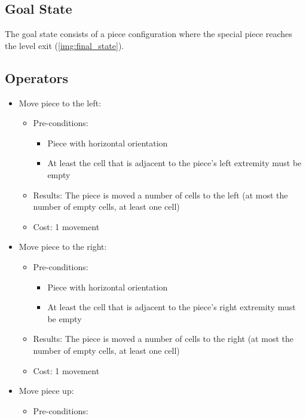 \documentclass[conference]{IEEEtran}
\begin{document}
\subsection{Goal State} \label{subsec:gs}
The goal state consists of a piece configuration where the special piece reaches the level exit (\autoref{img:final_state}).

\subsection{Operators} \label{subsec:op}
\begin{itemize}
    \item Move piece to the left:
    \begin{itemize}
        \item Pre-conditions:
        \begin{itemize}
            \item Piece with horizontal orientation
            \item At least the cell that is adjacent to the piece's left extremity must be empty
        \end{itemize}
        \item Results: The piece is moved a number of cells to the left (at most the number of empty cells, at least one cell)
        \item Cost: 1 movement
    \end{itemize}
    \item Move piece to the right:
    \begin{itemize}
        \item Pre-conditions:
        \begin{itemize}
            \item Piece with horizontal orientation
            \item At least the cell that is adjacent to the piece's right extremity must be empty
        \end{itemize}
        \item Results: The piece is moved a number of cells to the right (at most the number of empty cells, at least one cell)
        \item Cost: 1 movement
    \end{itemize}
    \item Move piece up:
        \begin{itemize}
        \item Pre-conditions:
        \begin{itemize}

\end{itemize}
\end{itemize}
\end{itemize}
\end{document}
